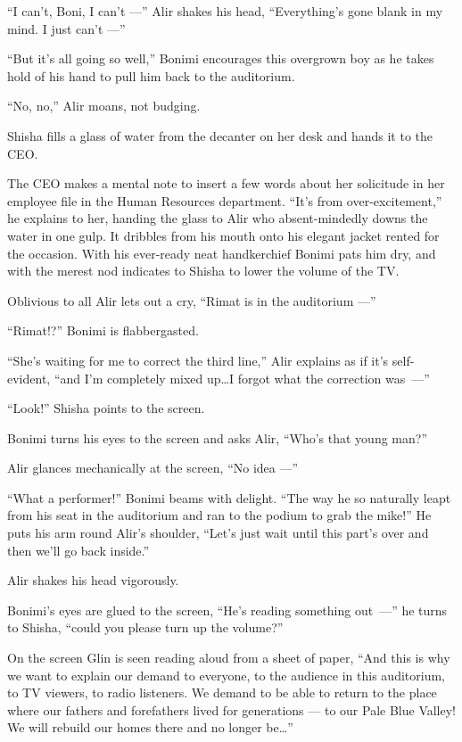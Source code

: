 \documentclass[twoside,11pt,openany]{book}
\begin{document}
``I can't, Boni, I can't ---'' Alir shakes his head, ``Everything's gone blank in my mind. I
just can't ---''

``But it's all going so well,'' Bonimi encourages this overgrown boy as he takes hold of his
hand to pull him back to the auditorium.

``No, no,'' Alir moans, not budging.

Shisha fills a glass of water from the decanter on her desk and hands it to the CEO.

The CEO makes a mental note to insert a few words about her solicitude in her employee file in the Human Resources
department.  ``It's from over-excitement,'' he explains to her, handing the glass to Alir
who absent-mindedly downs the water in one gulp. It dribbles from his mouth onto his elegant jacket rented for the
occasion.  With his ever-ready neat handkerchief Bonimi pats him dry, and with the merest nod indicates to Shisha to
lower the volume of the TV.

Oblivious to all Alir lets out a cry, ``Rimat is in the auditorium ---''

``Rimat!?'' Bonimi is flabbergasted.

``She's waiting for me to correct the third line,'' Alir explains as if it's self-evident,
``and I'm completely mixed up{\ldots}I forgot what the correction was~---''

``Look!'' Shisha points to the screen.

Bonimi turns his eyes to the screen and asks Alir, ``Who's that young man?''

Alir glances mechanically at the screen, ``No idea ---''

``What a performer!'' Bonimi beams with delight. ``The way he so naturally leapt
from his seat in the auditorium and ran to the podium to grab the mike!'' He puts his arm round Alir's
shoulder, ``Let's just wait until this part's over and then we'll go back inside.''

Alir shakes his head vigorously.

Bonimi's eyes are glued to the screen,
``He's reading something out~---'' he turns to Shisha,
``could you please turn up the volume?''

On the screen Glin is seen reading aloud from a sheet of paper, ``And this is why we want to explain our
demand to everyone, to the audience in this auditorium, to TV viewers, to radio listeners. We demand to be able to
return to the place where our fathers and forefathers lived for generations --- to our Pale Blue Valley! We will rebuild
our homes there and no longer be{\ldots}''
\end{document}
